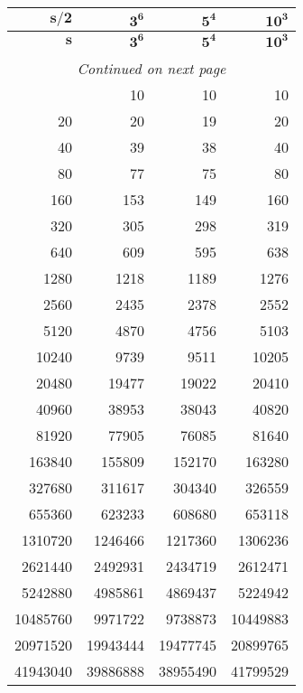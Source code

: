\documentclass[a4paper,10pt]{article}
\theoremstyle{plain} %
\theoremstyle{definition}
\theoremstyle{remark}
\begin{document}
\begin{center}
\begin{longtable}{r r r r}
\multicolumn{1}{r}{$\mathbf{s/2}$}&
\multicolumn{1}{r}{$\mathbf{3^6}$}&
\multicolumn{1}{r}{$\mathbf{5^4}$}&
\multicolumn{1}{r}{$\mathbf{10^3}$} \\
\endfirsthead
%
\multicolumn{1}{r}{$\mathbf{s}$}&
\multicolumn{1}{r}{$\mathbf{3^6}$}&
\multicolumn{1}{r}{$\mathbf{5^4}$}&
\multicolumn{1}{r}{$\mathbf{10^3}$} \\
\endhead
\rule{0pt}{1ex}\\
\multicolumn{4}{c}{{\footnotesize{\textit{Continued on next page}}}} \\
\endfoot
\endlastfoot
10 & 10 & 10 & 10 \\
20 & 20 & 19 & 20 \\
40 & 39 & 38 & 40 \\
80 & 77 & 75 & 80 \\
160 & 153 & 149 & 160 \\
320 & 305 & 298 & 319 \\
640 & 609 & 595 & 638 \\
1280 & 1218 & 1189 & 1276 \\
2560 & 2435 & 2378 & 2552 \\
5120 & 4870 & 4756 & 5103 \\
10240 & 9739 & 9511 & 10205 \\
20480 & 19477 & 19022 & 20410 \\
40960 & 38953 & 38043 & 40820 \\
81920 & 77905 & 76085 & 81640 \\
163840 & 155809 & 152170 & 163280 \\
327680 & 311617 & 304340 & 326559 \\
655360 & 623233 & 608680 & 653118 \\
1310720 & 1246466 & 1217360 & 1306236 \\
2621440 & 2492931 & 2434719 & 2612471 \\
5242880 & 4985861 & 4869437 & 5224942 \\
10485760 & 9971722 & 9738873 & 10449883 \\
20971520 & 19943444 & 19477745 & 20899765 \\
41943040 & 39886888 & 38955490 & 41799529
\end{longtable}
\label{tab:baserelations}
\end{center}
\end{document}
